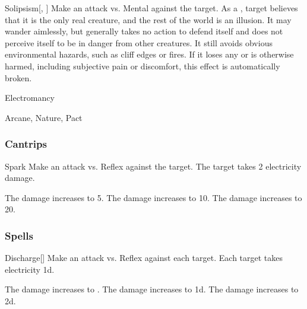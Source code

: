 \lowercase{\hypertarget{spell:Solipsism}{}}\label{spell:Solipsism}
\begin{freeability}[Rank 7]{\hypertarget{spell:Solipsism}{Solipsism}}[, ]
Make an attack vs. Mental against the target.
\hit As a , target believes that it is the only real creature, and the rest of the world is an illusion.
It may wander aimlessly, but generally takes no action to defend itself and does not perceive itself to be in danger from other creatures.
It still avoids obvious environmental hazards, such as cliff edges or fires.
If it loses any  or is otherwise harmed, including subjective pain or discomfort, this effect is automatically broken.
\end{freeability}
\vspace{0.25em}


\newpage
\begin{spellsection}{Electromancy}

\begin{spellheader}
\end{spellheader}


 Arcane, Nature, Pact

\subsubsection{Cantrips}


\begin{freeability}{Spark}
Make an attack vs. Reflex against the target.
\hit The target takes 2 electricity damage.

\rankline
{} The damage increases to 5.
 The damage increases to 10.
 The damage increases to 20.
\end{freeability}

\end{spellsection}


\subsubsection{Spells}


\lowercase{\hypertarget{spell:Discharge}{}}\label{spell:Discharge}
\begin{freeability}[Rank 1]{\hypertarget{spell:Discharge}{Discharge}}[]
Make an attack vs. Reflex against each target.
\hit Each target takes electricity  \minus1d.

\rankline
{} The damage increases to .
 The damage increases to  \plus1d.
 The damage increases to  \plus2d.
\end{freeability}
\vspace{0.25em}



